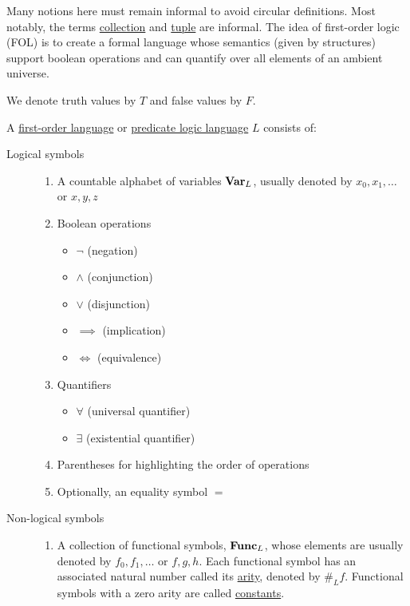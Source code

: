 Many notions here must remain informal to avoid circular definitions. Most notably, the terms \uline{collection} and \uline{tuple} are informal. The idea of first-order logic (FOL) is to create a formal language whose semantics (given by structures) support boolean operations and can quantify over all elements of an ambient universe.

We denote truth values by $T$ and false values by $F$.

\begin{definition}\label{def:first_order_language}\cite[19]{Lectures:logic_programming}
  A \uline{first-order language} or \uline{predicate logic language} $L$ consists of:
  \begin{description}
    \item[Logical symbols]
    \mbox{}
    \begin{enumerate}
      \item A countable alphabet of variables $\operatorname{\mathbf{Var}}_L$, usually denoted by $x_0, x_1, \ldots$ or $x, y, z$

      \item Boolean operations
      \begin{itemize}
        \item $\neg$ (negation)
        \item $\land$ (conjunction)
        \item $\lor$ (disjunction)
        \item $\implies$ (implication)
        \item $\iff$ (equivalence)
      \end{itemize}

      \item Quantifiers
      \begin{itemize}
        \item $\forall$ (universal quantifier)
        \item $\exists$ (existential quantifier)
      \end{itemize}

      \item Parentheses for highlighting the order of operations

      \item Optionally, an equality symbol $=$
    \end{enumerate}

    \item[Non-logical symbols]
    \mbox{}
    \begin{enumerate}
      \item A collection of functional symbols, $\operatorname{\mathbf{Func}}_L$, whose elements are usually denoted by $f_0, f_1, \ldots$ or $f, g, h$. Each functional symbol has an associated natural number called its \uline{arity}, denoted by $\#_L f$. Functional symbols with a zero arity are called \uline{constants}.


\end{enumerate}
\end{description}
\end{definition}
